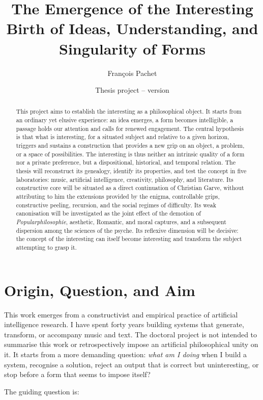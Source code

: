 \documentclass[11pt,a4paper]{article}
\title{The Emergence of the Interesting\\
\large Birth of Ideas, Understanding, and Singularity of Forms}
\author{François Pachet}
\date{Thesis project -- version \projectversion\\\small \projectdate}
\begin{document}
\maketitle

\begin{abstract}
This project aims to establish the interesting as a philosophical object. It
starts from an ordinary yet elusive experience: an idea emerges, a form becomes
intelligible, a passage holds our attention and calls for renewed engagement.
The central hypothesis is that what is interesting, for a situated subject and
relative to a given horizon, triggers and sustains a construction that provides
a new grip on an object, a problem, or a space of possibilities. The interesting
is thus neither an intrinsic quality of a form nor a private preference, but a
dispositional, historical, and temporal relation. The thesis will reconstruct
its genealogy, identify its properties, and test the concept in five
laboratories: music, artificial intelligence, creativity, philosophy, and
literature. Its constructive core will be situated as a direct continuation of
Christian Garve, without attributing to him the extensions provided by the
enigma, controllable grips, constructive peeling, recursion, and the social
regimes of difficulty. Its weak canonisation will be investigated as the joint
effect of the demotion of \emph{Popularphilosophie}, aesthetic, Romantic, and
moral captures, and a subsequent dispersion among the sciences of the psyche.
Its reflexive dimension will be decisive: the concept of the interesting can
itself become interesting and transform the subject attempting to grasp it.
\end{abstract}

\section{Origin, Question, and Aim}

This work emerges from a constructivist and empirical practice of artificial
intelligence research. I have spent forty years building systems that generate,
transform, or accompany music and text. The doctoral project is not intended to
summarise this work or retrospectively impose an artificial philosophical unity
on it. It starts from a more demanding question: \emph{what am I doing} when I
build a system, recognise a solution, reject an output that is correct but
uninteresting, or stop before a form that seems to impose itself?

The guiding question is:
\end{document}
